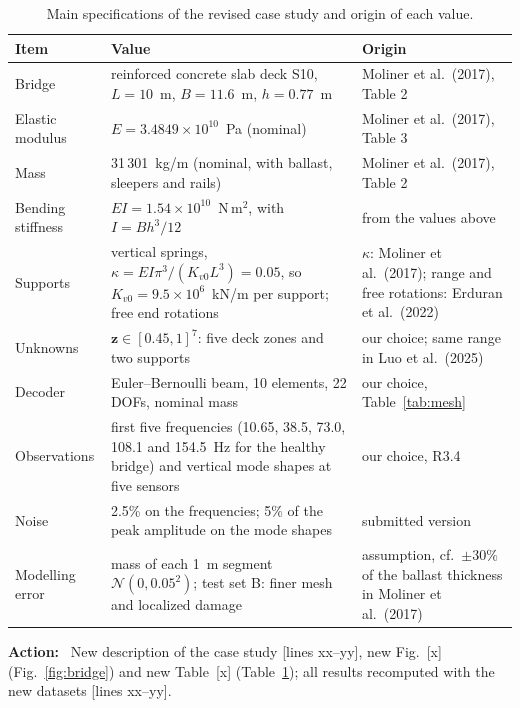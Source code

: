 \documentclass[11pt]{article}
\newenvironment{action}{\par\smallskip\noindent\color{resp}\textbf{Action:}\ }{\par}
\newcommand{\tbd}[1]{\textcolor{note}{\textsf{[#1]}}}
\newcommand{\lines}[1]{\tbd{lines #1}}
\newcommand{\z}{\mathbf{z}}
\begin{document}
\begin{table}[H]
\centering\small
\caption{Main specifications of the revised case study and origin of each value.}
\label{tab:specs}
\footnotesize
\begin{tabular}{p{3.5cm}p{6.8cm}p{4.5cm}}
\toprule
Item & Value & Origin \\
\midrule
Bridge & reinforced concrete slab deck S10, $L=10$~m, $B=11.6$~m, $h=0.77$~m & Moliner et al.\ (2017), Table 2 \\
Elastic modulus & $E=3.4849\times10^{10}$~Pa (nominal) & Moliner et al.\ (2017), Table 3 \\
Mass & 31\,301~kg/m (nominal, with ballast, sleepers and rails) & Moliner et al.\ (2017), Table 2 \\
Bending stiffness & $EI=1.54\times10^{10}$~N\,m$^2$, with $I=Bh^3/12$ & from the values above \\
Supports & vertical springs, $\kappa=EI\pi^3/(K_{v0}L^3)=0.05$, so $K_{v0}=9.5\times10^{6}$~kN/m per support; free end rotations &
$\kappa$: Moliner et al.\ (2017); range and free rotations: Erduran et al.\ (2022) \\
Unknowns & $\z\in[0.45,1]^7$: five deck zones and two supports & our choice; same range in Luo et al.\ (2025) \\
Decoder & Euler--Bernoulli beam, 10 elements, 22 DOFs, nominal mass & our choice, Table~\ref{tab:mesh} \\
Observations & first five frequencies (10.65, 38.5, 73.0, 108.1 and 154.5~Hz for the healthy bridge) and vertical mode shapes at five sensors & our choice, R3.4 \\
Noise & 2.5\% on the frequencies; 5\% of the peak amplitude on the mode shapes & submitted version \\
Modelling error & mass of each 1~m segment $\mathcal{N}(0,0.05^2)$; test set B: finer mesh and localized damage & assumption, cf.\ $\pm30\%$ of the ballast thickness in Moliner et al.\ (2017) \\
\bottomrule
\end{tabular}
\end{table}

\begin{action}
New description of the case study \lines{xx--yy}, new Fig.~\tbd{x} (Fig.~\ref{fig:bridge}) and new Table~\tbd{x}
(Table~\ref{tab:specs}); all results recomputed with the new datasets \lines{xx--yy}.
\end{action}

\end{document}
